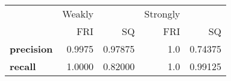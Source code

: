 \begin{tabular}{lrrrr}
\toprule
{} &  Weakly &          & Strongly &          \\
{} &     FRI &       SQ &      FRI &       SQ \\
\midrule
\textbf{precision} &  0.9975 &  0.97875 &      1.0 &  0.74375 \\
\textbf{recall   } &  1.0000 &  0.82000 &      1.0 &  0.99125 \\
\bottomrule
\end{tabular}
